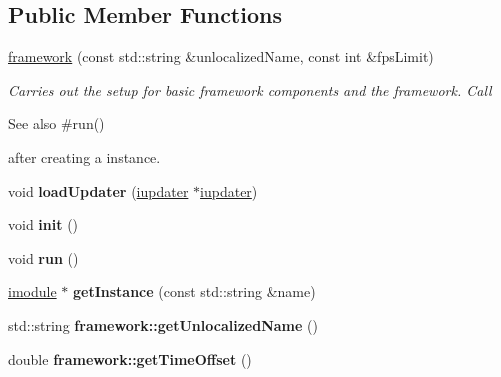 \subsection*{Public Member Functions}
\begin{DoxyCompactItemize}
\item 
\hyperlink{classflounder_1_1framework_a65b26709246ffe005c7660752147edb9}{framework} (const std\+::string \&unlocalized\+Name, const int \&fps\+Limit)
\begin{DoxyCompactList}\small\item\em Carries out the setup for basic framework components and the framework. Call \begin{DoxySeeAlso}{See also}
\#run()


\end{DoxySeeAlso}
after creating a instance. \end{DoxyCompactList}\item 
\mbox{\label{classflounder_1_1framework_a9aa08fa1643b8063cc05c10ce2e1aa54}} 
void {\bfseries load\+Updater} (\hyperlink{classflounder_1_1iupdater}{iupdater} $\ast$\hyperlink{classflounder_1_1iupdater}{iupdater})
\item 
\mbox{\label{classflounder_1_1framework_a88d0efc8e63448e5f342260ffd23054a}} 
void {\bfseries init} ()
\item 
\mbox{\label{classflounder_1_1framework_aa3a73c8e8f5f0c6ccef3e4de89982434}} 
void {\bfseries run} ()
\item 
\mbox{\label{classflounder_1_1framework_a84a2314d26174ab02b48bcda8fd5b4e4}} 
\hyperlink{classflounder_1_1imodule}{imodule} $\ast$ {\bfseries get\+Instance} (const std\+::string \&name)
\item 
\mbox{\label{classflounder_1_1framework_a27422918888d1eef6778c33bb3c655d1}} 
std\+::string {\bfseries framework\+::get\+Unlocalized\+Name} ()
\item 
\mbox{\label{classflounder_1_1framework_af26e334ebe0d5462ba3ba6ed58e83f23}} 
double {\bfseries framework\+::get\+Time\+Offset} ()
\item 
\mbox{\label{classflounder_1_1framework_aa8c8dd515d06adbe3a4bf83fb328453a}} 

\end{DoxyCompactItemize}
